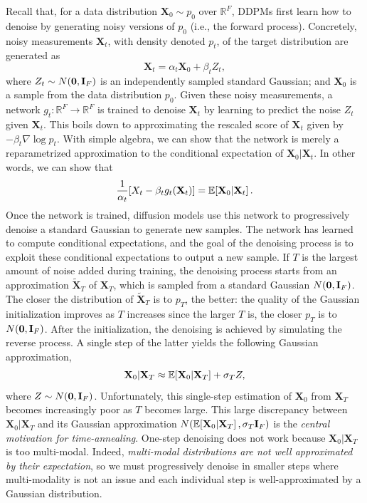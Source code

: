 Recall that, for a data distribution $\mathbf{X}_0 \sim p_0$ over $\mathbb{R}^F$, DDPMs first learn how to denoise by generating noisy versions of $p_0$ (i.e., the forward process). Concretely, noisy measurements $\mathbf{X}_t$, with density denoted $p_t$, of the target distribution are generated as  
\begin{equation}
\mathbf{X}_t = \alpha_t \mathbf{X}_0 +\beta_t Z_t,
\label{eq:noising}
\end{equation}
where $Z_t \sim N\mathopen{}\left(\mathbf{0}, \mathbf{I}_F\right)$ is an independently sampled standard Gaussian; and $\mathbf{X}_0$ is a sample from the data distribution $p_0$. Given these noisy measurements, a network $g_t:\mathbb{R}^F\to\mathbb{R}^F$ is trained to denoise $\mathbf{X}_t$ by learning to predict the noise $Z_t$ given $\mathbf{X}_t$. This boils down to approximating the rescaled score of $\mathbf{X}_t$ given by $-\beta_t \nabla \log p_t$. With simple algebra, we can show that the network is merely a reparametrized approximation to the conditional expectation of $\mathbf{X}_0|\mathbf{X}_t$. In other words, we can show that
\begin{equation}
\label{eq:reparam}
\frac{1}{\alpha_t}\mathopen{}\left[X_t - \beta_t g_t\mathopen{}\left(\mathbf{X}_t\right)\right] = \mathbb{E}\mathopen{}\left[\mathbf{X}_0|\mathbf{X}_t\right].
\end{equation}
Once the network is trained, diffusion models use this network to progressively denoise a standard Gaussian to generate new samples. The network has learned to compute conditional expectations, and the goal of the denoising process is to exploit these conditional expectations to output a new sample. If $T$ is the largest amount of noise added during training, the denoising process starts from an approximation $\tilde{\mathbf{X}}_T$ of $\mathbf{X}_T$, which is sampled from a standard Gaussian $N\mathopen{}\left(\mathbf{0}, \mathbf{I}_F\right)$. The closer the distribution of $\tilde{\mathbf{X}}_T$ is to $p_T$, the better: the quality of the Gaussian initialization improves as $T$ increases since the larger $T$ is, the closer $p_T$ is to $N\mathopen{}\left(\mathbf{0}, \mathbf{I}_F\right)$. After the initialization, the denoising is achieved by simulating the reverse process. A single step of the latter yields the following Gaussian approximation, 
\begin{equation}
\label{eq:revdiff}
    \mathbf{X}_0|\mathbf{X}_T \approx \mathbb{E}\mathopen{}\left[\mathbf{X}_0|\mathbf{X}_T\right] + \sigma_T Z,
\end{equation}
where $Z \sim N\mathopen{}\left(\mathbf{0}, \mathbf{I}_F\right)$. Unfortunately, this single-step estimation of $\mathbf{X}_0$ from $\mathbf{X}_T$ becomes increasingly poor as $T$ becomes large. This large discrepancy between $\mathbf{X}_0|\mathbf{X}_T$ and its Gaussian approximation $N\mathopen{}\left(\mathbb{E}\mathopen{}\left[\mathbf{X}_0|\mathbf{X}_T\right], \sigma_T \mathbf{I}_F\right)$ is the \emph{central motivation for time-annealing}. One-step denoising does not work because $\mathbf{X}_0|\mathbf{X}_T$ is too multi-modal. Indeed, \emph{multi-modal distributions are not well approximated by their expectation}, so we must progressively denoise in smaller steps where multi-modality is not an issue and each individual step is well-approximated by a Gaussian distribution. 

